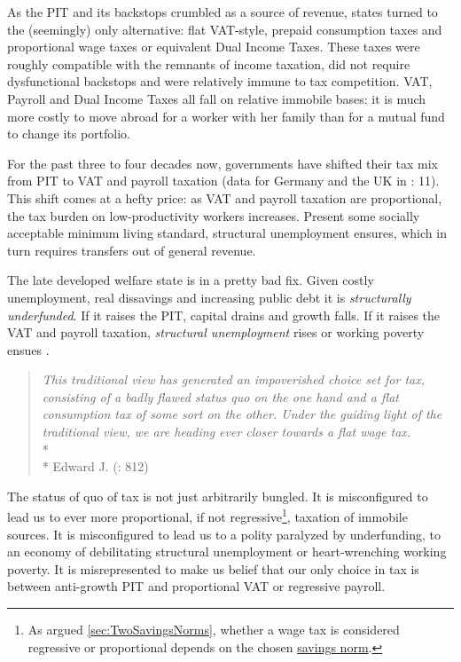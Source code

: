As the PIT and its backstops crumbled as a source of revenue, states turned to the (seemingly) only alternative: flat VAT-style, prepaid consumption taxes and proportional wage taxes or equivalent Dual Income Taxes. These taxes were roughly compatible with the remnants of income taxation, did not require dysfunctional backstops and were relatively immune to tax competition. VAT, Payroll and Dual Income Taxes all fall on relative immobile bases: it is much more costly to move abroad for a worker with her family than for a mutual fund to change its portfolio.

For the past three to four decades now, governments have shifted their tax mix from PIT to VAT and payroll taxation (data for Germany and the UK in \citealt{Kemmerling2009}: 11). This shift comes at a hefty price: as VAT and payroll taxation are proportional, the tax burden on low-productivity workers increases. Present some socially acceptable minimum living standard, structural unemployment ensures, which in turn requires transfers out of general revenue. 

The late developed welfare state is in a pretty bad fix. Given costly unemployment, real dissavings and increasing public debt it is \emph{structurally underfunded}. If it raises the PIT, capital drains and growth falls. If it raises the VAT and payroll taxation, \emph{structural unemployment} rises or working poverty ensues \citep{Kato2003}.

\begin{quote}
	\emph{This traditional view has generated an impoverished choice set for tax, consisting of a badly flawed status quo on the one hand and a flat consumption tax of some sort on the other. Under the guiding light of the traditional view, we are heading ever closer towards a flat wage tax.}\\*\\*
	Edward J. \citeauthor{McCaffery2005} (\citeyear{McCaffery2005}: 812)
\end{quote}

The status of quo of tax is not just arbitrarily bungled. It is misconfigured to lead us to ever more proportional, if not regressive\footnote{As argued \autoref{sec:TwoSavingsNorms}, whether a wage tax is considered regressive or proportional depends on the chosen \hyperref[sec:TwoSavingsNorms]{savings norm}.}, taxation of immobile sources. It is misconfigured to lead us to a polity paralyzed by underfunding, to an economy of debilitating structural unemployment or heart-wrenching working poverty. It is misrepresented to make us belief that our only choice in tax is between anti-growth PIT and proportional VAT or regressive payroll.


